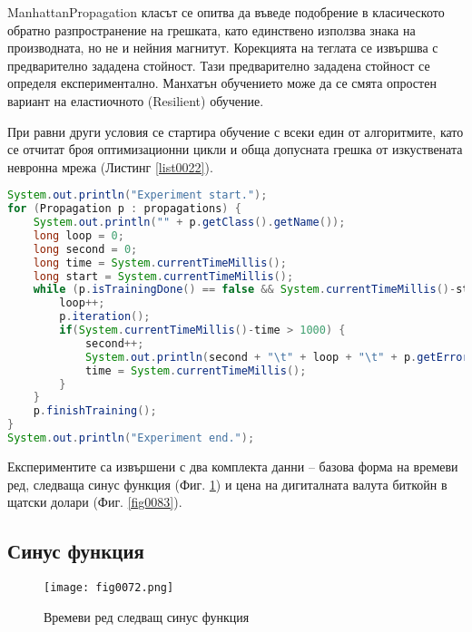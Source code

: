 ManhattanPropagation класът се опитва да въведе подобрение в класическото обратно разпространение на грешката, като единствено използва знака на производната, но не и нейния магнитут. Корекцията на теглата се извършва с предварително зададена стойност. Тази предварително зададена стойност се определя експериментално. Манхатън обучението може да се смята опростен вариант на еластиочното (Resilient) обучение.

При равни други условия се стартира обучение с всеки един от алгоритмите, като се отчитат броя оптимизационни цикли и обща допусната грешка от изкуствената невронна мрежа (Листинг \ref{list0022}).

\begin{lstlisting}[caption=Експериментална проверка на точните числени методи, language=Java, basicstyle=\tiny, label=list0022]
System.out.println("Experiment start.");
for (Propagation p : propagations) {
    System.out.println("" + p.getClass().getName());
    long loop = 0;
    long second = 0;
    long time = System.currentTimeMillis();
    long start = System.currentTimeMillis();
    while (p.isTrainingDone() == false && System.currentTimeMillis()-start < 1*60*1000) {
        loop++;
        p.iteration();
        if(System.currentTimeMillis()-time > 1000) {
            second++;
            System.out.println(second + "\t" + loop + "\t" + p.getError());
            time = System.currentTimeMillis();
        }
    }
    p.finishTraining();
}
System.out.println("Experiment end.");
\end{lstlisting}

Експериментите са извършени с два комплекта данни – базова форма на времеви ред, следваща синус функция (Фиг. \ref{fig0072}) и цена на дигиталната валута биткойн в щатски долари (Фиг. \ref{fig0083}). 

\subsection{Синус функция}

\begin{figure}[H]
  \centering
  \texttt{[image: fig0072.png]}
  \caption{Времеви ред следващ синус функция}
\label{fig0072}
\end{figure}

